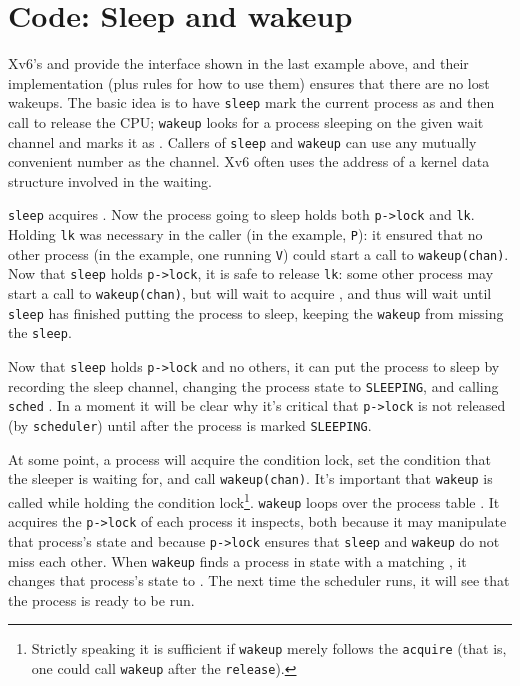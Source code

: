 \section{Code: Sleep and wakeup}

Xv6's
and
provide the interface shown in the last example above,
and their implementation (plus rules for how to use them)
ensures that there are no lost wakeups.
The basic idea is to have
\lstinline{sleep}
mark the current process as
and then call
to release the CPU;
\lstinline{wakeup}
looks for a process sleeping on the given wait channel
and marks it as 
.
Callers of
\lstinline{sleep}
and
\lstinline{wakeup}
can use any mutually convenient number as the channel.
Xv6 often uses the address
of a kernel data structure involved in the waiting.

\lstinline{sleep}
acquires 
.
Now the process going to sleep holds both
\lstinline{p->lock}
and
\lstinline{lk}.
Holding
\lstinline{lk}
was necessary in the caller (in the example,
\lstinline{P}):
it
ensured that no other process (in the example,
one running
\lstinline{V})
could start a call to
\lstinline{wakeup(chan)}.
Now that
\lstinline{sleep}
holds
\lstinline{p->lock},
it is safe to release
\lstinline{lk}:
some other process may start a call to
\lstinline{wakeup(chan)},
but
will wait to acquire
,
and thus will wait until
\lstinline{sleep}
has finished putting the process to sleep,
keeping the
\lstinline{wakeup}
from missing the
\lstinline{sleep}.

Now that
\lstinline{sleep}
holds
\lstinline{p->lock}
and no others,
it can put the process to sleep by recording
the sleep channel,
changing the process state to \texttt{SLEEPING},
and calling
\lstinline{sched}
.
In a moment it will be clear why it's critical that
\lstinline{p->lock} is not released (by \lstinline{scheduler}) until after
the process is marked \texttt{SLEEPING}.

At some point, a process will acquire the condition lock,
set the condition that the sleeper is waiting for,
and call \lstinline{wakeup(chan)}.
It's important that \lstinline{wakeup} is called
while holding the condition lock\footnote{%
%
Strictly speaking it is sufficient if
\lstinline{wakeup}
merely follows the
\lstinline{acquire}
(that is, one could call
\lstinline{wakeup}
after the
\lstinline{release}).%
%
}.
\lstinline{wakeup}
loops over the process table
.
It acquires the
\lstinline{p->lock}
of each process it inspects,
both because it may manipulate that process's state
and because
\lstinline{p->lock}
ensures that
\lstinline{sleep}
and
\lstinline{wakeup}
do not miss each other.
When \lstinline{wakeup} finds a process in state
with a matching
,
it changes that process's state to
.
The next time the scheduler runs, it will
see that the process is ready to be run.

